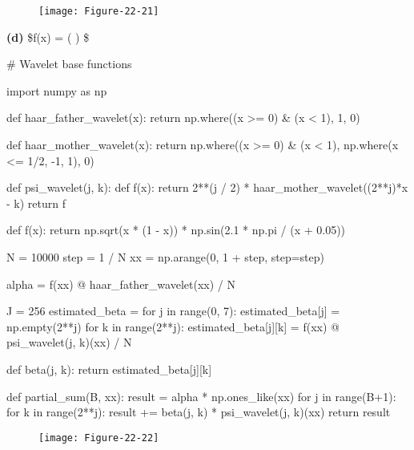 \begin{figure}[H]
\texttt{[image: Figure-22-21]}
\end{figure}

\textbf{(d)} \$f(x) =  \sin \left(
 \right) \$

\begin{python}
# Wavelet base functions

import numpy as np

def haar_father_wavelet(x):
    return np.where((x >= 0) & (x < 1), 1, 0)

def haar_mother_wavelet(x):
    return np.where((x >= 0) & (x < 1), np.where(x <= 1/2, -1, 1), 0)

def psi_wavelet(j, k):
    def f(x):
        return 2**(j / 2) * haar_mother_wavelet((2**j)*x - k)
    return f
\end{python}

\begin{python}
def f(x):
    return np.sqrt(x * (1 - x)) * np.sin(2.1 * np.pi / (x + 0.05))
\end{python}

\begin{python}
N = 10000
step = 1 / N
xx = np.arange(0, 1 + step, step=step)

alpha = f(xx) @ haar_father_wavelet(xx) / N

J = 256
estimated_beta = {}
for j in range(0, 7):
    estimated_beta[j] = np.empty(2**j)
    for k in range(2**j):
        estimated_beta[j][k] = f(xx) @ psi_wavelet(j, k)(xx) / N
    
def beta(j, k):
    return estimated_beta[j][k]
\end{python}

\begin{python}
def partial_sum(B, xx):
    result = alpha * np.ones_like(xx)
    for j in range(B+1):
        for k in range(2**j):
            result += beta(j, k) * psi_wavelet(j, k)(xx)
    return result
\end{python}


\begin{figure}[H]
\texttt{[image: Figure-22-22]}
\end{figure}
